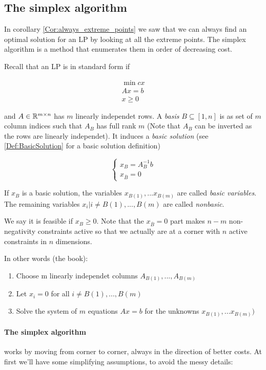 \subsection{The simplex algorithm}

In corollary \ref{Cor:always_extreme_points} we saw that we can always find an optimal solution for an LP by looking at all the extreme points. The simplex algorithm is a method that enumerates them in order of decreasing cost. 

Recall that an LP is in standard form if

\begin{align*}
\min cx\\
Ax = b\\
x\geq 0
\end{align*}

and $A\in \mathbb{R}^{m\times n}$ has $m$ linearly independet rows. A \emph{basis} $B\subseteq [1,n]$ is as set of $m$ column indices such that $A_B$ has full rank $m$ (Note that $A_B$ can be inverted as the rows are linearly independet). It induces a \emph{basic solution} (see \ref{Def:BasicSolution} for a basic solution definition)

\[\begin{cases} x_B = A^{-1}_Bb\\ x_{\bar B} = 0\end{cases}\]

If $x_B$ is a basic solution, the variables $x_{B(1)},...x_{B(m)}$ are called \emph{basic variables}. The remaining variables $x_i|i \neq B(1),...,B(m)$ are called \emph{nonbasic}. 

We say it is feasible if $x_B\geq 0$. Note that the $x_{\bar B}=0$ part makes $n-m$ non-negativity constraints active so that we actually are at a corner with $n$ active constraints in $n$ dimensions.

In other words (the book):
\begin{enumerate}
 \item Choose m linearly independet columns $A_{B(1)},...,A_{B(m)}$
 \item Let $x_i=0$ for all $i \neq B(1),...,B(m)$
 \item Solve the system of $m$ equations $Ax=b$ for the unknowns $x_{B(1)},...x_{B(m)})$
\end{enumerate}

\paragraph*{The simplex algorithm} works by moving from corner to corner, always in the direction of better costs. At first we'll have some simplifying assumptions, to avoid the messy details:

